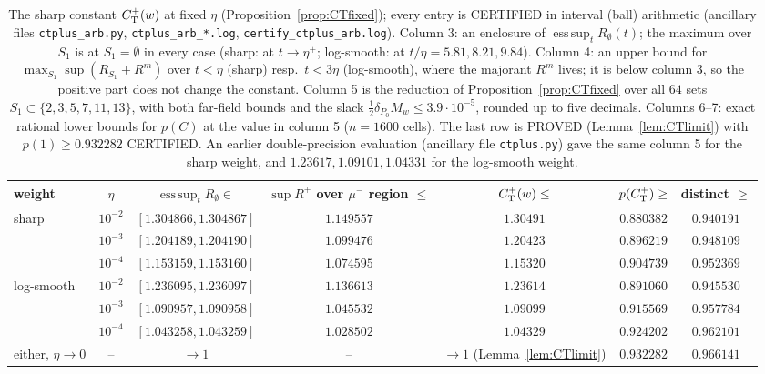 \begin{table}[ht]
\centering\footnotesize\setlength{\tabcolsep}{3pt}
\begin{tabular}{@{}lcccccc@{}}
\hline
weight & $\eta$ & $\operatorname{ess\,sup}_tR_\emptyset\in$ & $\sup R^+$ over $\mu^-$ region $\le$ & $C^{+}_{\mathrm T}(w)\le$ & $p(C^{+}_{\mathrm T})\ge$ & distinct $\ge$\\
\hline
sharp & $10^{-2}$ & $[1.304866,1.304867]$ & $1.149557$ & $1.30491$ & $0.880382$ & $0.940191$\\
 & $10^{-3}$ & $[1.204189,1.204190]$ & $1.099476$ & $1.20423$ & $0.896219$ & $0.948109$\\
 & $10^{-4}$ & $[1.153159,1.153160]$ & $1.074595$ & $1.15320$ & $0.904739$ & $0.952369$\\
log-smooth & $10^{-2}$ & $[1.236095,1.236097]$ & $1.136613$ & $1.23614$ & $0.891060$ & $0.945530$\\
 & $10^{-3}$ & $[1.090957,1.090958]$ & $1.045532$ & $1.09099$ & $0.915569$ & $0.957784$\\
 & $10^{-4}$ & $[1.043258,1.043259]$ & $1.028502$ & $1.04329$ & $0.924202$ & $0.962101$\\
either, $\eta\to0$ & -- & $\to1$ & -- & $\to1$ (Lemma~\ref{lem:CTlimit}) & $0.932282$ & $0.966141$\\
\hline
\end{tabular}
\caption{The sharp constant $C^{+}_{\mathrm T}(w)$ at fixed $\eta$ (Proposition~\ref{prop:CTfixed}); every entry is CERTIFIED in interval
(ball) arithmetic (ancillary files \texttt{ctplus\_arb.py}, \texttt{ctplus\_arb\_*.log}, \texttt{certify\_ctplus\_arb.log}).
Column 3: an enclosure of $\operatorname{ess\,sup}_tR_\emptyset(t)$; the maximum over $S_1$ is at $S_1=\emptyset$ in every case
(sharp: at $t\to\eta^+$; log-smooth: at $t/\eta=5.81,8.21,9.84$). Column 4: an upper bound for $\max_{S_1}\sup(R_{S_1}+R^m)$ over
$t<\eta$ (sharp) resp.\ $t<3\eta$ (log-smooth), where the majorant $R^m$ lives; it is below column 3, so the positive part does not
change the constant. Column 5 is the reduction of Proposition~\ref{prop:CTfixed} over all $64$ sets $S_1\subset\{2,3,5,7,11,13\}$,
with both far-field bounds and the slack $\frac12\delta_{P_0}M_w\le3.9\cdot10^{-5}$, rounded up to five decimals. Columns 6--7:
exact rational lower bounds for $p(C)$ at the value in column 5 ($n=1600$ cells). The last row is PROVED (Lemma~\ref{lem:CTlimit})
with $p(1)\ge0.932282$ CERTIFIED. An earlier double-precision evaluation (ancillary file \texttt{ctplus.py}) gave the same
column 5 for the sharp weight, and $1.23617,1.09101,1.04331$ for the log-smooth weight.}
\label{tab:CTfixed}
\end{table}

